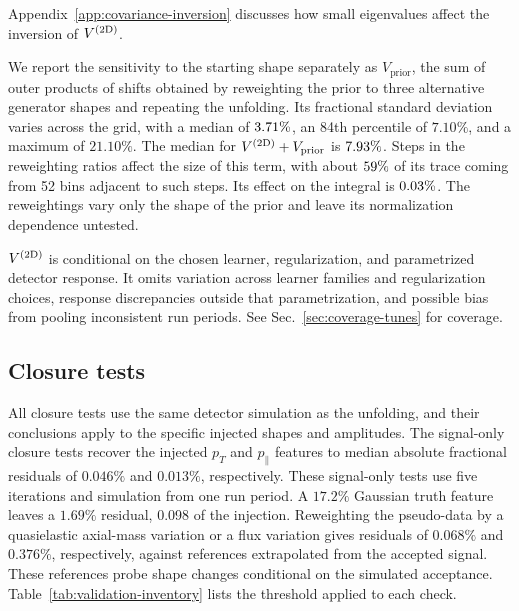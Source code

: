 Appendix~\ref{app:covariance-inversion} discusses how small eigenvalues affect the inversion of $V^{(2\mathrm{D})}$.

\label{sec:uq-2d-scope} We report the sensitivity to the starting shape separately as $V_{\mathrm{prior}}$, the sum of outer products of shifts obtained by reweighting the prior to three alternative generator shapes and repeating the unfolding. Its fractional standard deviation varies across the grid, with a median of $3.71\%$, an 84th percentile of $7.10\%$, and a maximum of $21.10\%$. The median for $V^{(2\mathrm{D})}+V_{\mathrm{prior}}$ is $7.93\%$. Steps in the reweighting ratios affect the size of this term, with about $\fpeval{round(59.4,0)}\%$ of its trace coming from 52 bins adjacent to such steps. Its effect on the integral is $0.03\%$. The reweightings vary only the shape of the prior and leave its normalization dependence untested.

$V^{(2\mathrm{D})}$ is conditional on the chosen learner, regularization, and parametrized detector response. It omits variation across learner families and regularization choices, response discrepancies outside that parametrization, and possible bias from pooling inconsistent run periods. See Sec.~\ref{sec:coverage-tunes} for coverage.

\subsection{Closure tests}
\label{sec:muon-cross-section-validation}
\label{sec:validation}

All closure tests use the same detector simulation as the unfolding, and their conclusions apply to the specific injected shapes and amplitudes. The signal-only closure tests recover the injected $p_T$ and $p_\parallel$ features to median absolute fractional residuals of $0.046\%$ and $0.013\%$, respectively. These signal-only tests use five iterations and simulation from one run period. A $17.2\%$ Gaussian truth feature leaves a $1.69\%$ residual, 0.098 of the injection. Reweighting the pseudo-data by a quasielastic axial-mass variation or a flux variation gives residuals of $0.068\%$ and $0.376\%$, respectively, against references extrapolated from the accepted signal. These references probe shape changes conditional on the simulated acceptance. Table~\ref{tab:validation-inventory} lists the threshold applied to each check.

